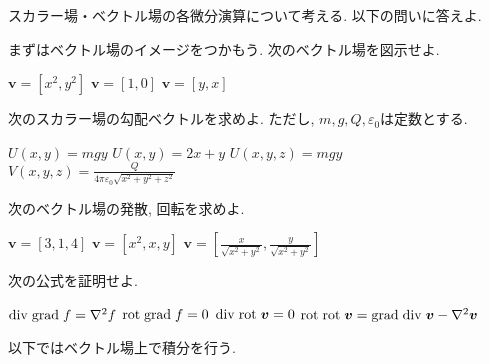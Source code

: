 \documentclass[a4j,dvipdfmx]{jsarticle}
\renewcommand{\div}{{\rm div}\hspace{1mm}}
\newcommand{\grad}{{\rm grad}\hspace{1mm}}
\newcommand{\rot}{{\rm rot}\hspace{1mm}}
\begin{document}
        スカラー場・ベクトル場の各微分演算について考える. 以下の問いに答えよ.
        \begin{qparts}
            \qpart まずはベクトル場のイメージをつかもう. 次のベクトル場を図示せよ.
            \begin{qlist}
                \qitem $\bm{v}=[x^2,y^2]$
                \qitem $\bm{v}=[1,0]$
                \qitem $\bm{v}=[y,x]$
            \end{qlist}
            \qpart 次のスカラー場の勾配ベクトルを求めよ. ただし, $m,g,Q,\varepsilon_0$は定数とする.
            \begin{qlist}
                \qitem $U(x,y)=mgy$
                \qitem $U(x,y)=2x+y$
                \qitem $U(x,y,z)=mgy$
                \qitem $\displaystyle V(x,y,z)=\frac{Q}{4\pi\varepsilon_0\sqrt{x^2+y^2+z^2}}$
            \end{qlist}
            \qpart 次のベクトル場の発散, 回転を求めよ.
            \begin{qlist}
                \qitem $\bm{v}=[3,1,4]$
                \qitem $\bm{v}=[x^2,x,y]$
                \qitem $\displaystyle \bm{v}=\left[\frac{x}{\sqrt{x^2+y^2}},\frac{y}{\sqrt{x^2+y^2}}\right]$
            \end{qlist}
            \qpart 次の公式を証明せよ.
            \begin{qlist}
                \qitem $\div\grad f=\nabla^2f$
                \qitem $\rot\grad f = 0$
                \qitem $\div\rot \bm{v}=0$
                \qitem $\rot\rot\bm{v}=\grad\div\bm{v}-\nabla^2\bm{v}$
            \end{qlist}
        \end{qparts}
    \clearpage
        以下ではベクトル場上で積分を行う.
\end{document}
